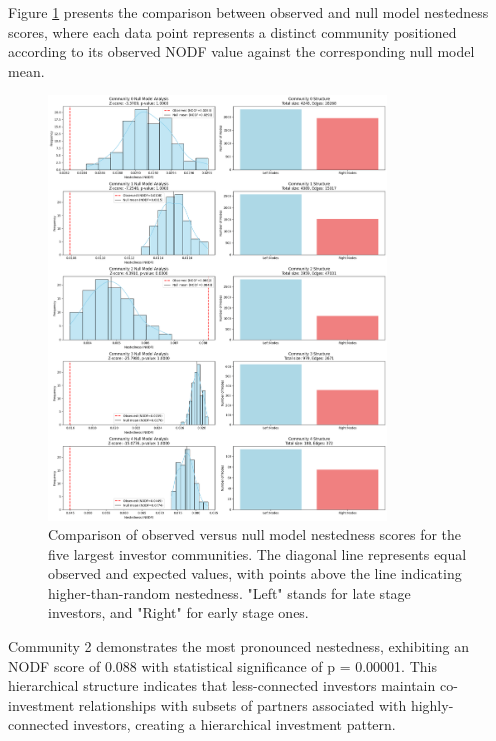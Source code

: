 Figure \ref{fig:nestedness_comparison} presents the comparison between observed and null model nestedness scores, where each data point represents a distinct community positioned according to its observed NODF value against the corresponding null model mean.

\begin{figure}[htbp]
\centering
\includegraphics[width=0.8\textwidth]{./assets/null-model-analysis-top-5.png}
\caption{Comparison of observed versus null model nestedness scores for the five largest investor communities. The diagonal line represents equal observed and expected values, with points above the line indicating higher-than-random nestedness. "Left" stands for late stage investors, and "Right" for early stage ones.}
\label{fig:nestedness_comparison}
\end{figure}

\newcommand{\interestingCommunity}{2}
\newcommand{\interestingCommunityNODF}{0.088}
\newcommand{\interestingCommunityPValue}{0.00001}

Community \interestingCommunity{} demonstrates the most pronounced nestedness, exhibiting an NODF score of \interestingCommunityNODF{} with statistical significance of p = \interestingCommunityPValue{}. This hierarchical structure indicates that less-connected investors maintain co-investment relationships with subsets of partners associated with highly-connected investors, creating a hierarchical investment pattern.

